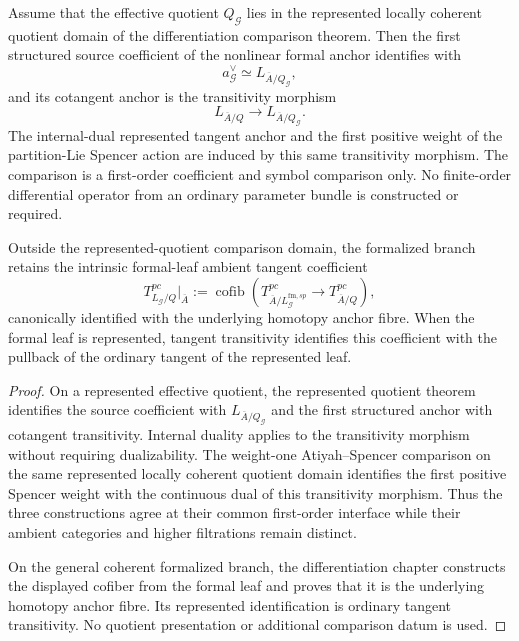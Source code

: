 \begin{proposition}
\label{prop:symmetry-noether-first-order-compatibility-without-an-operator-realization}
Assume that the effective quotient $Q_{\mathcal G}$ lies in the represented locally
coherent quotient domain of the differentiation comparison theorem.  Then the
first structured source coefficient of the nonlinear formal anchor identifies with
\[
a_{\mathcal G}^{\vee}\simeq L_{\overline A/Q_{\mathcal G}},
\]
and its cotangent anchor is the transitivity morphism
\[
L_{\overline A/Q}
\longrightarrow
L_{\overline A/Q_{\mathcal G}}.
\]
The internal-dual represented tangent anchor and the first positive weight of the
partition-Lie Spencer action are induced by this same transitivity morphism.  The
comparison is a first-order coefficient and symbol comparison only.  No
finite-order differential operator from an ordinary parameter bundle is constructed
or required.

Outside the represented-quotient comparison domain, the formalized branch retains
the intrinsic formal-leaf ambient tangent coefficient
\[
\boxed{
T^{pc}_{L_{\mathcal G}/Q}\big|_{\overline A}
:=
\operatorname{cofib}
\left(
T^{pc}_{\overline A/L_{\mathcal G}^{\mathrm{fm},sp}}
\longrightarrow
T^{pc}_{\overline A/Q}
\right),
}
\]
canonically identified with the underlying homotopy anchor fibre.  When the formal
leaf is represented, tangent transitivity identifies this coefficient with the
pullback of the ordinary tangent of the represented leaf.
\end{proposition}

\begin{proof}
On a represented effective quotient, the represented quotient theorem identifies
the source coefficient with $L_{\overline A/Q_{\mathcal G}}$ and the first
structured anchor with cotangent transitivity.  Internal duality applies to the
transitivity morphism without requiring dualizability.  The weight-one
Atiyah--Spencer comparison on the same represented locally coherent quotient domain
identifies the first positive Spencer weight with the continuous dual of this
transitivity morphism.  Thus the three constructions agree at their common
first-order interface while their ambient categories and higher filtrations remain
distinct.

On the general coherent formalized branch, the differentiation chapter constructs
the displayed cofiber from the formal leaf and proves that it is the underlying
homotopy anchor fibre.  Its represented identification is ordinary tangent
transitivity.  No quotient presentation or additional comparison datum is used.
\end{proof}

